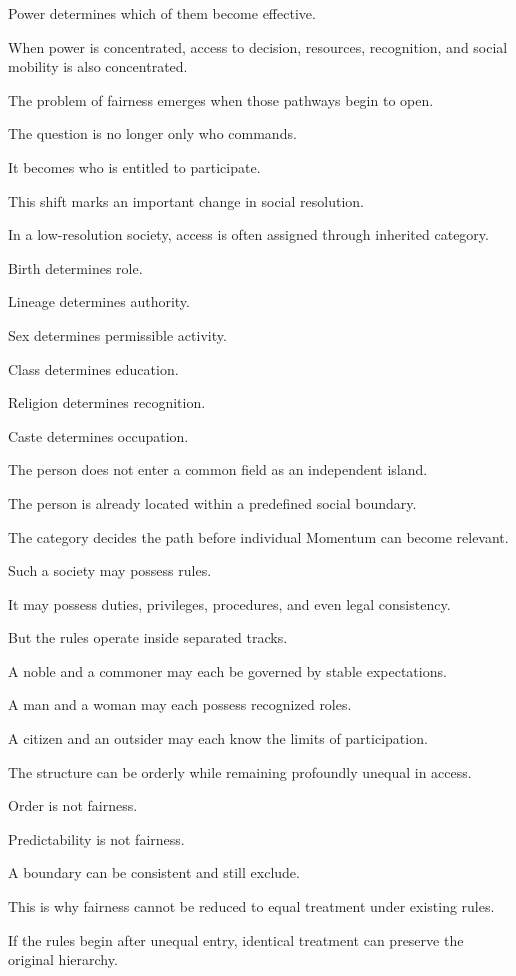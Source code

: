 Power determines which of them become effective.

When power is concentrated, access to decision, resources, recognition, and social mobility is also concentrated.

The problem of fairness emerges when those pathways begin to open.

The question is no longer only who commands.

It becomes who is entitled to participate.

This shift marks an important change in social resolution.

In a low-resolution society, access is often assigned through inherited category.

Birth determines role.

Lineage determines authority.

Sex determines permissible activity.

Class determines education.

Religion determines recognition.

Caste determines occupation.

The person does not enter a common field as an independent island.

The person is already located within a predefined social boundary.

The category decides the path before individual Momentum can become relevant.

Such a society may possess rules.

It may possess duties, privileges, procedures, and even legal consistency.

But the rules operate inside separated tracks.

A noble and a commoner may each be governed by stable expectations.

A man and a woman may each possess recognized roles.

A citizen and an outsider may each know the limits of participation.

The structure can be orderly while remaining profoundly unequal in access.

Order is not fairness.

Predictability is not fairness.

A boundary can be consistent and still exclude.

This is why fairness cannot be reduced to equal treatment under existing rules.

If the rules begin after unequal entry, identical treatment can preserve the original hierarchy.

